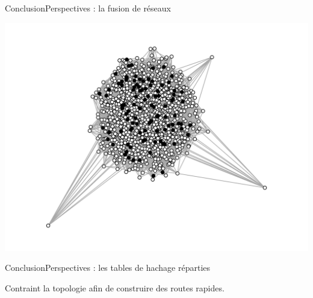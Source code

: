 \begin{frame}{Conclusion}{Perspectives : la fusion de réseaux}
\begin{minipage}{0.325\textwidth}
    \includegraphics[width=1.2\textwidth]{img/graphC.png}
  \end{minipage}

\end{frame}

\begin{frame}{Conclusion}{Perspectives : les tables de hachage réparties}


  Contraint la topologie afin de construire des routes rapides.

  \vspace{0.5cm}



  \vspace{0.5cm}

  \begin{center}
    
  \end{center}

\end{frame}

